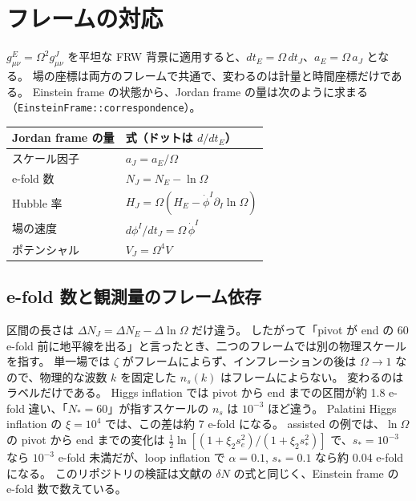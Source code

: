 \documentclass[a4paper,11pt]{ltjsarticle}
\newcommand{\code}[1]{\texttt{#1}}
\begin{document}
\section{フレームの対応}
\label{app:frames}

$g^E_{\mu\nu}=\Omega^2g^J_{\mu\nu}$ を平坦な FRW 背景に適用すると、$dt_E=\Omega\,dt_J$、$a_E=\Omega\,a_J$ となる。
場の座標は両方のフレームで共通で、変わるのは計量と時間座標だけである。
Einstein frame の状態から、Jordan frame の量は次のように求まる（\code{EinsteinFrame::correspondence}）。
\begin{center}
\begin{tabular}{ll}
\toprule
Jordan frame の量 & 式（ドットは $d/dt_E$） \\
\midrule
スケール因子 & $a_J=a_E/\Omega$ \\
e-fold 数 & $N_J=N_E-\ln\Omega$ \\
Hubble 率 & $H_J=\Omega\left(H_E-\dot\phi^I\partial_I\ln\Omega\right)$ \\
場の速度 & $d\phi^I/dt_J=\Omega\,\dot\phi^I$ \\
ポテンシャル & $V_J=\Omega^4V$ \\
\bottomrule
\end{tabular}
\end{center}

\subsection{e-fold 数と観測量のフレーム依存}
区間の長さは $\Delta N_J=\Delta N_E-\Delta\ln\Omega$ だけ違う。
したがって「pivot が end の 60 e-fold 前に地平線を出る」と言ったとき、二つのフレームでは別の物理スケールを指す。
単一場では $\zeta$ がフレームによらず、インフレーションの後は $\Omega\to1$ なので、物理的な波数 $k$ を固定した $n_s(k)$ はフレームによらない。
変わるのはラベルだけである。
Higgs inflation では pivot から end までの区間が約 1.8 e-fold 違い、「$N_*=60$」が指すスケールの $n_s$ は $10^{-3}$ ほど違う。
Palatini Higgs inflation の $\xi=10^4$ では、この差は約 7 e-fold になる。
assisted の例では、$\ln\Omega$ の pivot から end までの変化は $\tfrac12\ln[(1+\xi_2s_e^2)/(1+\xi_2s_*^2)]$ で、$s_*=10^{-3}$ なら $10^{-3}$ e-fold 未満だが、loop inflation で $\alpha=0.1$, $s_*=0.1$ なら約 0.04 e-fold になる。
このリポジトリの検証は文献の $\delta N$ の式と同じく、Einstein frame の e-fold 数で数えている。
\end{document}
